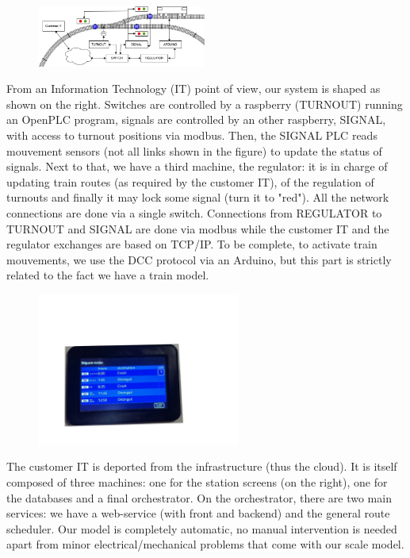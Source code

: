 \documentclass[runningheads]{llncs}
\begin{document}
\medskip

\begin{figure}
\vspace{-6mm}
\includegraphics[height=20mm]{TrainSchema.png}
\end{figure}


From an Information Technology (IT) point of view, our system is shaped as shown on the right. Switches are controlled by a raspberry (TURNOUT) running an OpenPLC program, signals are controlled by an other raspberry, SIGNAL, with access to turnout positions via modbus. Then, the SIGNAL PLC reads mouvement sensors  (not all links shown in the figure) to update the status of signals. Next to that, we have a third machine, the regulator: it is in charge of updating train routes (as required by the customer IT),  of the regulation of turnouts and finally it may lock some signal (turn it to "red"). All the network connections are done via a single switch. Connections from REGULATOR to TURNOUT and SIGNAL are done via modbus while the customer IT and the regulator exchanges  are based on TCP/IP.  To be complete, to activate train mouvements, we use the DCC protocol via an Arduino, but this part is strictly related to the fact we have a train model. 


\begin{figure}
\hspace{-10mm}
 \begin{minipage}{0.3\textwidth}
        \centering
        \vspace{-24mm}
\includegraphics[height=50mm]{ZoomAffichage.png}
    \end{minipage}
\end{figure}

 The customer IT is deported from the infrastructure (thus the cloud).  It is itself composed of three machines: one for the station screens (on the right), one for the databases and a final orchestrator. On the orchestrator, there are two main services: we have a web-service (with front and backend) and the general route scheduler.  Our model is completely automatic, no manual intervention is needed apart from minor electrical/mechanical problems that come with our scale model.
 
\end{document}
